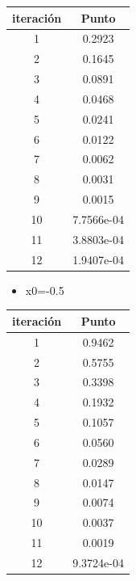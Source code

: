 \documentclass{udparticle}
\begin{document}
\begin{enumerate}
\begin{enumerate}
\begin{table}[H]
\begin{tabular} { |c|c|}
        \hline
        iteración  &  Punto\\
        \hline
        1 &   0.2923       \\
         \hline
        2 &     0.1645   \\
         \hline
        3 &  0.0891 \\
         \hline
        4 &  0.0468     \\
         \hline
        5 &    0.0241    \\
         \hline
        6 & 0.0122       \\
         \hline
        7 &    0.0062 \\
         \hline
        8 &  0.0031     \\
         \hline
        9 &      0.0015    \\
         \hline
        10 &    7.7566e-04     \\
         \hline
        11 &   3.8803e-04  \\
         \hline
        12 &   1.9407e-04      \\
        \hline
        
        \end{tabular}
        
    \end{table}
 \begin{itemize}
\item x0=-0.5
\end{itemize}

\begin{table}[H]
    \centering
        \begin{tabular} { |c|c|}
        
        \hline
        iteración  &  Punto\\
        \hline
        1 &  0.9462        \\
         \hline
        2 &     0.5755  \\
         \hline
        3 &    0.3398        \\
 
         \hline
        4 &   0.1932  \\
         \hline
        5 &  0.1057       \\
         \hline
        6 &      0.0560  \\
         \hline
        7 & 0.0289    \\
         \hline
        8 & 0.0147      \\
         \hline
        9 &   0.0074       \\
         \hline
        10 &    0.0037     \\
         \hline
        11 &   0.0019  \\
         \hline
        12 &   9.3724e-04     \\
        \hline
        

\end{tabular}
\end{table}
\end{enumerate}
\end{enumerate}
\end{document}
